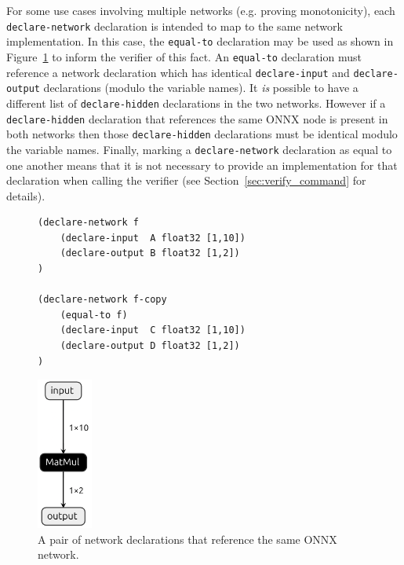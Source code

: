 For some use cases involving multiple networks (e.g. proving monotonicity), each \texttt{declare-network} declaration is intended to map to the same network implementation. In this case, the \texttt{equal-to} declaration may be used as shown in Figure~\ref{fig:multiple-equal-networks} to inform the verifier of this fact. An \texttt{equal-to} declaration must reference a network declaration which has identical \texttt{declare-input} and \texttt{declare-output} declarations (modulo the variable names). It \emph{is} possible to have a different list of \texttt{declare-hidden} declarations in the two networks. However if a \texttt{declare-hidden} declaration that references the same ONNX node is present in both networks then those \texttt{declare-hidden} declarations must be identical modulo the variable names. 
 Finally, marking a \texttt{declare-network} declaration as equal to one another means that it is not necessary to provide an implementation for that declaration when calling the verifier (see Section~\ref{sec:verify_command} for details).
 
\begin{figure}[h!]
    \begin{minipage}[c]{0.64\textwidth}
        \begin{lstlisting}[style=lbnf]
(declare-network f
    (declare-input  A float32 [1,10])
    (declare-output B float32 [1,2])
)

(declare-network f-copy
    (equal-to f)
    (declare-input  C float32 [1,10])
    (declare-output D float32 [1,2])
)\end{lstlisting}
    \end{minipage}
    \begin{minipage}[c]{0.35\textwidth}
        \centering
        \includegraphics[height=5cm]{imgs/simple_net.onnx.png}
    \end{minipage}
    \caption{A pair of \vnnlib{} network declarations that reference the same ONNX network.}
    \label{fig:multiple-equal-networks}
\end{figure}

